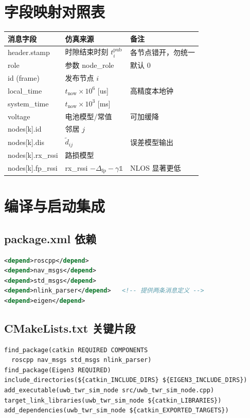 \documentclass[11pt,a4paper]{article}
\begin{document}
\section{字段映射对照表}
\begin{longtable}{@{}p{3.6cm}p{4.0cm}p{6.4cm}@{}}
\toprule
\textbf{消息字段} & \textbf{仿真来源} & \textbf{备注}\\
\midrule
\endhead
header.stamp        & 时隙结束时刻 $t_i^{\text{pub}}$ & 各节点错开，勿统一\\
role                & 参数 node\_role        & 默认 0\\
id (frame)          & 发布节点 $i$           & \\
local\_time         & $t_{\text{now}}\times10^6$ [us] & 高精度本地钟\\
system\_time        & $t_{\text{now}}\times10^3$ [ms] & \\
voltage             & 电池模型/常值          & 可加缓降\\
nodes[k].id         & 邻居 $j$               & \\
nodes[k].dis        & $\tilde{d}_{ij}$       & 误差模型输出\\
nodes[k].rx\_rssi   & 路损模型               & \\
nodes[k].fp\_rssi   & rx\_rssi $-\Delta_{\text{fp}}-\gamma\mathbb{1}$ & NLOS 显著更低\\
\bottomrule
\end{longtable}

\section{编译与启动集成}
\subsection{package.xml 依赖}
\begin{lstlisting}[language=XML]
<depend>roscpp</depend>
<depend>nav_msgs</depend>
<depend>std_msgs</depend>
<depend>nlink_parser</depend>   <!-- 提供两条消息定义 -->
<depend>eigen</depend>
\end{lstlisting}

\subsection{CMakeLists.txt 关键片段}
\begin{lstlisting}
find_package(catkin REQUIRED COMPONENTS
  roscpp nav_msgs std_msgs nlink_parser)
find_package(Eigen3 REQUIRED)
include_directories(${catkin_INCLUDE_DIRS} ${EIGEN3_INCLUDE_DIRS})
add_executable(uwb_twr_sim_node src/uwb_twr_sim_node.cpp)
target_link_libraries(uwb_twr_sim_node ${catkin_LIBRARIES})
add_dependencies(uwb_twr_sim_node ${catkin_EXPORTED_TARGETS})
\end{lstlisting}
\end{document}
